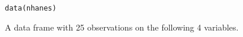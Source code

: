 \begin{Description}\relax
\end{Description}
\begin{Usage}
\begin{verbatim}data(nhanes)\end{verbatim}
\end{Usage}
\begin{Format}\relax
A data frame with 25 observations on the following 4 variables.
\end{Format}
\begin{Source}\relax
\end{Source}

